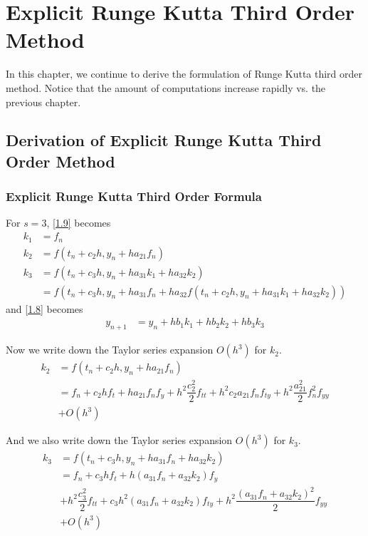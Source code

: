 \documentclass[a4paper,oneside]{book}
\numberwithin{equation}{chapter}
\begin{document}
\chapter{Explicit Runge Kutta Third Order Method}
In this chapter, we continue to derive the formulation of Runge Kutta third order method. Notice that the amount of computations increase rapidly vs. the previous chapter.
\section{Derivation of Explicit Runge Kutta Third Order Method}
\subsection{Explicit Runge Kutta Third Order Formula}
For $s=3$, \eqref{1.9} becomes
\begin{align}
{k_1} &= {f_n}\\
{k_2} &= f\left( {{t_n} + {c_2}h,{y_n} + h{a_{21}}{f_n}} \right)\\
{k_3} &= f\left( {{t_n} + {c_3}h,{y_n} + h{a_{31}}{k_1} + h{a_{32}}{k_2}} \right)\\
 &= f\left( {{t_n} + {c_3}h,{y_n} + h{a_{31}}{f_n} + h{a_{32}}f\left( {{t_n} + {c_2}h,{y_n} + h{a_{31}}{k_1} + h{a_{32}}{k_2}} \right)} \right)
\end{align}
and \eqref{1.8} becomes
\begin{align}
\label{3.5}
{{y_{n + 1}}} &= {{y_n}} + h{b_1}{k_1} + h{b_2}{k_2} + h{b_3}{k_3}
\end{align}

Now we write down the Taylor series expansion $O\left(h^3\right)$ for $k_2$.
\begin{align}
{k_2} &= f\left( {{t_n} + {c_2}h,{y_n} + h{a_{21}}{f_n}} \right)\\
 &= {f_n} + {c_2}h{f_t} + h{a_{21}}{f_n}{f_y} + {h^2}\dfrac{{c_2^2}}{2}{f_{tt}} + {h^2}{c_2}{a_{21}}{f_n}{f_{ty}} + {h^2}\dfrac{{a_{21}^2}}{2}f_n^2{f_{yy}} \\
 &+ O\left( {{h^3}} \right)
 \label{3.7}
\end{align}

And we also write down the Taylor series expansion $O\left(h^3\right)$ for $k_3$.
\begin{align}
{k_3} &= f\left( {{t_n} + {c_3}h,{y_n} + h{a_{31}}{f_n} + h{a_{32}}{k_2}} \right)\\
 &= {f_n} + {c_3}h{f_t} + h\left( {{a_{31}}{f_n} + {a_{32}}{k_2}} \right){f_y} \\
& + {h^2}\dfrac{{c_3^2}}{2}{f_{tt}} + {c_3}{h^2}\left( {{a_{31}}{f_n} + {a_{32}}{k_2}} \right){f_{ty}} + {h^2}\dfrac{{{{\left( {{a_{31}}{f_n} + {a_{32}}{k_2}} \right)}^2}}}{2}{f_{yy}} \\
&+ O\left( {{h^3}} \right)
 \label{3.10}
\end{align}
\end{document}
